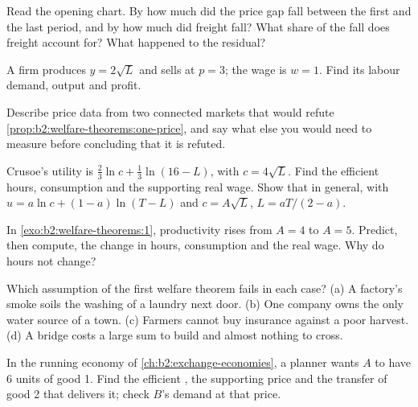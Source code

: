 \begin{exercise}[$\star$]\label{exo:b2:welfare-theorems:2}
Read the opening chart. By how much did the price gap fall between the first and the last period, and by
how much did freight fall? What share of the fall does freight account for? What happened to the
residual?
\end{exercise}

\begin{exercise}[$\star$]\label{exo:b2:welfare-theorems:3}
A firm produces $y = 2\sqrt L$ and sells at $p = 3$; the wage is $w = 1$. Find its labour demand, output
and profit.
\end{exercise}

\begin{exercise}[$\star$]\label{exo:b2:welfare-theorems:4}
Describe price data from two connected markets that would refute \cref{prop:b2:welfare-theorems:one-price},
and say what else you would need to measure before concluding that it is refuted.
\end{exercise}

\begin{exercise}[$\star\star$]\label{exo:b2:welfare-theorems:5}
Crusoe's utility is $\tfrac23\ln c + \tfrac13\ln(16 - L)$, with $c = 4\sqrt L$. Find the efficient hours,
consumption and the supporting real wage. Show that in general, with $u = a\ln c + (1 - a)\ln(T - L)$ and
$c = A\sqrt L$, $L = aT/(2 - a)$.
\end{exercise}

\begin{exercise}[$\star\star$]\label{exo:b2:welfare-theorems:6}
In \cref{exo:b2:welfare-theorems:1}, productivity rises from $A = 4$ to $A = 5$. Predict, then compute, the
change in hours, consumption and the real wage. Why do hours not change?
\end{exercise}

\begin{exercise}[$\star\star$]\label{exo:b2:welfare-theorems:7}
Which assumption of the first welfare theorem fails in each case? (a) A factory's smoke soils the washing
of a laundry next door. (b) One company owns the only water source of a town. (c) Farmers cannot buy
insurance against a poor harvest. (d) A bridge costs a large sum to build and almost nothing to cross.
\end{exercise}

\begin{exercise}[$\star\star$]\label{exo:b2:welfare-theorems:8}
In the running economy of \cref{ch:b2:exchange-economies}, a planner wants $A$ to have 6 units of good 1.
Find the efficient , the supporting price and the transfer of good 2 that delivers it; check
$B$'s demand at that price.
\end{exercise}

